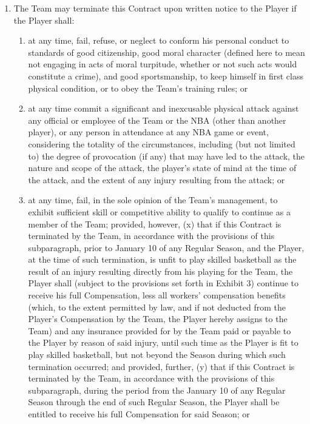 \documentclass[
]{book}
\providecommand{\tightlist}{%
  \setlength{\itemsep}{0pt}\setlength{\parskip}{0pt}}
\begin{document}
\begin{enumerate}
\def\labelenumi{(\alph{enumi})}
\tightlist
\item
  The Team may terminate this Contract upon written notice to the Player if the Player shall:

  \begin{enumerate}
  \def\labelenumii{(\roman{enumii})}
  \tightlist
  \item
    at any time, fail, refuse, or neglect to conform his personal conduct to standards of good citizenship, good moral character (defined here to mean not engaging in acts of moral turpitude, whether or not such acts would constitute a crime), and good sportsmanship, to keep himself in first class physical condition, or to obey the Team's training rules; or
  \item
    at any time commit a significant and inexcusable physical attack against any official or employee of the Team or the NBA (other than another player), or any person in attendance at any NBA game or event, considering the totality of the circumstances, including (but not limited to) the degree of provocation (if any) that may have led to the attack, the nature and scope of the attack, the player's state of mind at the time of the attack, and the extent of any injury resulting from the attack; or
  \item
    at any time, fail, in the sole opinion of the Team's management, to exhibit sufficient skill or competitive ability to qualify to continue as a member of the Team; provided, however, (x) that if this Contract is terminated by the Team, in accordance with the provisions of this subparagraph, prior to January 10 of any Regular Season, and the Player, at the time of such termination, is unfit to play skilled basketball as the result of an injury resulting directly from his playing for the Team, the Player shall (subject to the provisions set forth in Exhibit 3) continue to receive his full Compensation, less all workers' compensation benefits (which, to the extent permitted by law, and if not deducted from the Player's Compensation by the Team, the Player hereby assigns to the Team) and any insurance provided for by the Team paid or payable to the Player by reason of said injury, until such time as the Player is fit to play skilled basketball, but not beyond the Season during which such termination occurred; and provided, further, (y) that if this Contract is terminated by the Team, in accordance with the provisions of this subparagraph, during the period from the January 10 of any Regular Season through the end of such Regular Season, the Player shall be entitled to receive his full Compensation for said Season; or

\end{enumerate}
\end{enumerate}
\end{document}
